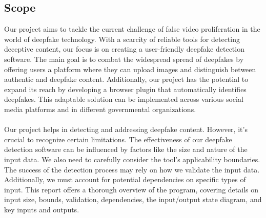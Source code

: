 \subsection{Scope}

Our project aims to tackle the current challenge of false video proliferation in the world of deepfake technology. With a scarcity of reliable tools for detecting deceptive content, our focus is on creating a user-friendly deepfake detection software. The main goal is to combat the widespread spread of deepfakes by offering users a platform where they can upload images and distinguish between authentic and deepfake content. Additionally, our project has the potential to expand its reach by developing a browser plugin that automatically identifies deepfakes. This adaptable solution can be implemented across various social media platforms and in different governmental organizations.
\\\\
Our project helps in detecting and addressing deepfake content. However, it's crucial to recognize certain limitations. The effectiveness of our deepfake detection software can be influenced by factors like the size and nature of the input data. We also need to carefully consider the tool's applicability boundaries. The success of the detection process may rely on how we validate the input data. Additionally, we must account for potential dependencies on specific types of input. This report offers a thorough overview of the program, covering details on input size, bounds, validation, dependencies, the input/output state diagram, and key inputs and outputs.
\newpage